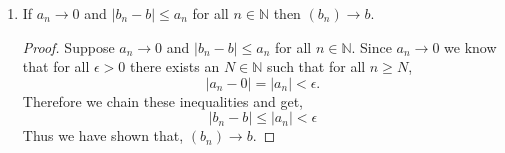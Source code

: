 \documentclass[12pt]{article}
\makeatletter
\theoremstyle{homework}
\newenvironment{exercise}[1]
{\def\@currentlabel{#1}\exercisecore}
{\endexercisecore}
\newcommand{\Nats}{\ensuremath{\mathbb N}}
\makeatother
\begin{document}
\begin{exercise}{2.3.10}
\begin{enumerate}
    \begin{proof}
      Suppose $(a_n) \to a$ and $(b_n - a_n) \to 0$. Rewriting the expression $|b_n - a|$,
      \begin{equation*}
        |b_n - a| = |b_n - a_n + a_n - a|.
      \end{equation*}
      By the triangle inequality,
      \begin{equation*}
        |b_n - a_n + a_n - a| \le |b_n - a_n| + |a_n - a|.
      \end{equation*}
      Since $(a_n) \to a$ and $(b_n - a_n) \to 0$ we know that for all $\epsilon > 0$ there exists a $N \in \Nats$ such that for all $n \geq N$,
      \begin{equation*}
        |a_n - a| < \dfrac{\epsilon}{2},
      \end{equation*} 
      \begin{equation*}
        |a_n - b_n| < \dfrac{\epsilon}{2}.
      \end{equation*}
      Therefore,
      \begin{align*}
        |b_n - a| &\le |b_n - a_n| + |a_n - a|,\\
        &< \dfrac{\epsilon}{2} + \dfrac{\epsilon}{2},\\
        <\epsilon.
      \end{align*}
      Thus we have shown that, $(b_n) \to a$.
    \end{proof}
    \vspace{.25in}



    \item If $a_n \to 0$ and $|b_n - b| \le a_n$ for all $n \in \Nats$ then  $(b_n) \to b$.\\
    
    \begin{proof}
      Suppose $a_n \to 0$ and $|b_n - b| \le a_n$ for all $n \in \Nats$. Since $a_n \to 0$ we know that for all $\epsilon > 0$
      there exists an $N \in \Nats$ such that for all $n \geq N$, 
      \begin{equation*}
        |a_n - 0| = |a_n| < \epsilon.
      \end{equation*}
      Therefore we chain these inequalities and get,
      \begin{equation*}
        |b_n - b| \le |a_n| < \epsilon
      \end{equation*}
      Thus we have shown that, $(b_n) \to b$. 
    \end{proof}
    
  \end{enumerate}

\end{exercise}
\vspace{.5in}
\end{document}
